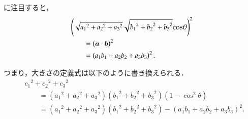                 に注目すると，
                    \begin{align*}
                        &\left(
                            \sqrt{{a_{1}}^{2}+{a_{2}}^{2}+{a_{3}}^{2}}
                            \sqrt{{b_{1}}^{2}+{b_{2}}^{2}+{b_{3}}^{2}}
                            {\cos}\theta
                        \right)^{2} \\
                            &\qquad=
                            \left(
                                \boldsymbol{a} \cdot \boldsymbol{b}
                            \right)^{2} \\
                            &\qquad=
                            \left(
                                a_{1}b_{1}+a_{2}b_{2}+a_{3}b_{3}
                            \right)^{2}.
                    \end{align*}

                つまり，大きさの定義式は以下のように書き換えられる．
                    \begin{align*}
                        &{c_{1}}^{2}+{c_{2}}^{2}+{c_{3}}^{2} \\
                        &\qquad =   \left({a_{1}}^{2}+{a_{2}}^{2}+{a_{3}}^{2}\right)
                                    \left({b_{1}}^{2}+{b_{2}}^{2}+{b_{3}}^{2}\right)
                                    \left(1 - {\cos}^{2}\theta \right) \\
                        &\qquad =   \left({a_{1}}^{2}+{a_{2}}^{2}+{a_{3}}^{2}\right)
                                    \left({b_{1}}^{2}+{b_{2}}^{2}+{b_{3}}^{2}\right)
                                    -   \left(
                                            a_{1}b_{1}+a_{2}b_{2}+a_{3}b_{3}
                                        \right)^{2}.
                    \end{align*}

